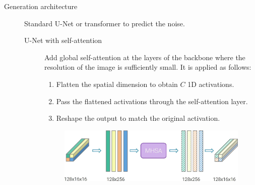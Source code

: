 \begin{description}
    \item[Generation architecture]
        Standard U-Net or transformer to predict the noise.

        \begin{description}
            \item[U-Net with self-attention]
                Add global self-attention at the layers of the backbone where the resolution of the image is sufficiently small. It is applied as follows:
                \begin{enumerate}
                    \item Flatten the spatial dimension to obtain $C$ 1D activations.
                    \item Pass the flattened activations through the self-attention layer.
                    \item Reshape the output to match the original activation.
                \end{enumerate}

                \begin{figure}[H]
                    \centering
                    \includegraphics[width=0.7\linewidth]{./img/unet_attention.jpg}
                \end{figure}
        \end{description}
\end{description}


